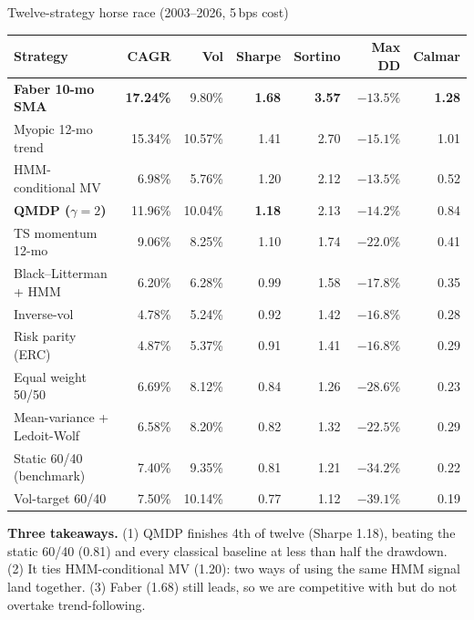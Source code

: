 \documentclass[11pt,aspectratio=169]{beamer}
\begin{document}
\begin{frame}{Twelve-strategy horse race (2003--2026, 5\,bps cost)}
\centering\scriptsize\setlength{\tabcolsep}{4pt}\renewcommand{\arraystretch}{0.98}
\begin{tabular}{l rrrrrr}
\toprule
\textbf{Strategy} & \textbf{CAGR} & \textbf{Vol} & \textbf{Sharpe} & \textbf{Sortino} & \textbf{Max DD} & \textbf{Calmar} \\
\midrule
\rowcolor{cg!20}\textbf{Faber 10-mo SMA} & \textbf{17.24\%} & 9.80\%  & \textbf{1.68} & \textbf{3.57} & $-13.5\%$ & \textbf{1.28} \\
Myopic 12-mo trend                       & 15.34\% & 10.57\% & 1.41 & 2.70 & $-15.1\%$ & 1.01 \\
HMM-conditional MV                       & 6.98\%  & 5.76\%  & 1.20 & 2.12 & $-13.5\%$ & 0.52 \\
\rowcolor{cb!16}\textbf{QMDP ($\gamma{=}2$)} & 11.96\% & 10.04\% & \textbf{1.18} & 2.13 & $\mathbf{-14.2\%}$ & 0.84 \\
TS momentum 12-mo                        & 9.06\%  & 8.25\%  & 1.10 & 1.74 & $-22.0\%$ & 0.41 \\
Black--Litterman + HMM                   & 6.20\%  & 6.28\%  & 0.99 & 1.58 & $-17.8\%$ & 0.35 \\
Inverse-vol                              & 4.78\%  & 5.24\%  & 0.92 & 1.42 & $-16.8\%$ & 0.28 \\
Risk parity (ERC)                        & 4.87\%  & 5.37\%  & 0.91 & 1.41 & $-16.8\%$ & 0.29 \\
Equal weight 50/50                       & 6.69\%  & 8.12\%  & 0.84 & 1.26 & $-28.6\%$ & 0.23 \\
Mean-variance + Ledoit-Wolf              & 6.58\%  & 8.20\%  & 0.82 & 1.32 & $-22.5\%$ & 0.29 \\
Static 60/40 (benchmark)                 & 7.40\%  & 9.35\%  & 0.81 & 1.21 & $-34.2\%$ & 0.22 \\
Vol-target 60/40                         & 7.50\%  & 10.14\% & 0.77 & 1.12 & $-39.1\%$ & 0.19 \\
\bottomrule
\end{tabular}

\medskip\footnotesize
\textbf{Three takeaways.} (1) \alert{QMDP finishes 4th of twelve} (Sharpe 1.18), beating the static 60/40 (0.81) and every classical baseline at less than half the drawdown. (2) It ties HMM-conditional MV (1.20): two ways of using the same HMM signal land together. (3) Faber (1.68) still leads, so we are competitive with but do not overtake trend-following.
\end{frame}
\end{document}

